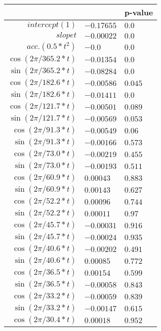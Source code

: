 \begin{tabular}{r|ll}
\hline
                        & \hat{\beta}   & p-value   \\
\hline
 $intercept (1)$        & $-0.17655$    & $0.0$     \\
 $slope t$              & $-0.00022$    & $0.0$     \\
 $acc. (0.5 * t^2)$     & $-0.0$        & $0.0$     \\
 $\cos(2\pi/365.2 * t)$ & $-0.01354$    & $0.0$     \\
 $\sin(2\pi/365.2 * t)$ & $-0.08284$    & $0.0$     \\
 $\cos(2\pi/182.6 * t)$ & $-0.00586$    & $0.045$   \\
 $\sin(2\pi/182.6 * t)$ & $-0.01411$    & $0.0$     \\
 $\cos(2\pi/121.7 * t)$ & $-0.00501$    & $0.089$   \\
 $\sin(2\pi/121.7 * t)$ & $-0.00569$    & $0.053$   \\
 $\cos(2\pi/91.3 * t)$  & $-0.00549$    & $0.06$    \\
 $\sin(2\pi/91.3 * t)$  & $-0.00166$    & $0.573$   \\
 $\cos(2\pi/73.0 * t)$  & $-0.00219$    & $0.455$   \\
 $\sin(2\pi/73.0 * t)$  & $-0.00193$    & $0.511$   \\
 $\cos(2\pi/60.9 * t)$  & $0.00043$     & $0.883$   \\
 $\sin(2\pi/60.9 * t)$  & $0.00143$     & $0.627$   \\
 $\cos(2\pi/52.2 * t)$  & $0.00096$     & $0.744$   \\
 $\sin(2\pi/52.2 * t)$  & $0.00011$     & $0.97$    \\
 $\cos(2\pi/45.7 * t)$  & $-0.00031$    & $0.916$   \\
 $\sin(2\pi/45.7 * t)$  & $-0.00024$    & $0.935$   \\
 $\cos(2\pi/40.6 * t)$  & $-0.00202$    & $0.491$   \\
 $\sin(2\pi/40.6 * t)$  & $0.00085$     & $0.772$   \\
 $\cos(2\pi/36.5 * t)$  & $0.00154$     & $0.599$   \\
 $\sin(2\pi/36.5 * t)$  & $-0.00058$    & $0.843$   \\
 $\cos(2\pi/33.2 * t)$  & $-0.00059$    & $0.839$   \\
 $\sin(2\pi/33.2 * t)$  & $-0.00147$    & $0.615$   \\
 $\cos(2\pi/30.4 * t)$  & $0.00018$     & $0.952$   \\

\end{tabular}
